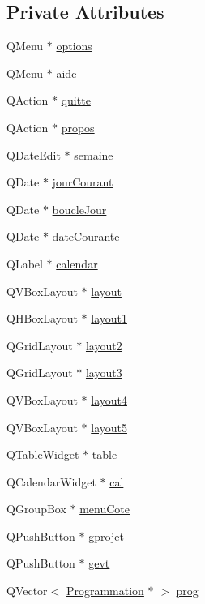 \subsection*{Private Attributes}
\begin{DoxyCompactItemize}
\item 
Q\+Menu $\ast$ \hyperlink{class_interface_a5c22d42f0a82b546269f2265dc4020bf}{options}
\item 
Q\+Menu $\ast$ \hyperlink{class_interface_a8e1bd8a8cfb02dd361ece990addd7515}{aide}
\item 
Q\+Action $\ast$ \hyperlink{class_interface_af2d5dd8a8ec08aca6ef98b14657b2d03}{quitte}
\item 
Q\+Action $\ast$ \hyperlink{class_interface_a2282b9ebbfc4d6b78aff0c4f09edf3ef}{propos}
\item 
Q\+Date\+Edit $\ast$ \hyperlink{class_interface_ac4ca6cf95990077c3c695f54b9340d46}{semaine}
\item 
Q\+Date $\ast$ \hyperlink{class_interface_a25db9c3292f0f8d545d0241f11a59293}{jour\+Courant}
\item 
Q\+Date $\ast$ \hyperlink{class_interface_aa5946e70fad2d32fd4dc55c88bd440e5}{boucle\+Jour}
\item 
Q\+Date $\ast$ \hyperlink{class_interface_afa9df6cf4b8edcdea7e9c31e97c1ab3e}{date\+Courante}
\item 
Q\+Label $\ast$ \hyperlink{class_interface_a0b7d1dff057048c33ff74e0eb8919378}{calendar}
\item 
Q\+V\+Box\+Layout $\ast$ \hyperlink{class_interface_a4d03301a342f9024c1e39009f127a5ec}{layout}
\item 
Q\+H\+Box\+Layout $\ast$ \hyperlink{class_interface_aeb8ae11dbb700b6a19c303a39f80999c}{layout1}
\item 
Q\+Grid\+Layout $\ast$ \hyperlink{class_interface_a99dba2dd8a820785420c7b16677b18a6}{layout2}
\item 
Q\+Grid\+Layout $\ast$ \hyperlink{class_interface_a296d3fd708454c14456b50c56d3f87c4}{layout3}
\item 
Q\+V\+Box\+Layout $\ast$ \hyperlink{class_interface_a723b35155d78820333a349c15f66c4e9}{layout4}
\item 
Q\+V\+Box\+Layout $\ast$ \hyperlink{class_interface_ab996ff872c831e183bace04cc136bb49}{layout5}
\item 
Q\+Table\+Widget $\ast$ \hyperlink{class_interface_add370ece6c97151da99ebab84362c6a1}{table}
\item 
Q\+Calendar\+Widget $\ast$ \hyperlink{class_interface_a53a4b3fb1f0885aea0395658a4b36022}{cal}
\item 
Q\+Group\+Box $\ast$ \hyperlink{class_interface_a2f0340a091c08fb4d6c3357fbd156d21}{menu\+Cote}
\item 
Q\+Push\+Button $\ast$ \hyperlink{class_interface_aa11e7c29121814ee23bafd43ab68b534}{gprojet}
\item 
Q\+Push\+Button $\ast$ \hyperlink{class_interface_a5ad660e0308903af33f1e40daa239010}{gevt}
\item 
Q\+Vector$<$ \hyperlink{class_programmation}{Programmation} $\ast$ $>$ \hyperlink{class_interface_a8c9a2e9fb9a19f879383fb160430c1b6}{prog}
\end{DoxyCompactItemize}


